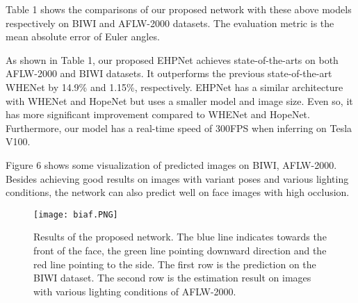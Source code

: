 \documentclass[a4paper,twoside]{article}
\begin{document}
Table 1 shows the comparisons of our proposed network with these above models respectively on BIWI and AFLW-2000 datasets. The evaluation metric is the mean absolute error of Euler angles. 

As shown in Table 1, our proposed EHPNet achieves state-of-the-arts on both AFLW-2000 and BIWI datasets. It outperforms the previous state-of-the-art WHENet by 14.9\% and 1.15\%, respectively. EHPNet has a similar architecture with WHENet and HopeNet but uses a smaller model and image size. Even so, it has more significant improvement compared to WHENet and HopeNet. Furthermore, our model has a real-time speed of 300FPS when inferring on Tesla V100.

Figure 6 shows some visualization of predicted images on BIWI, AFLW-2000. Besides achieving good results on images with variant poses and various lighting conditions, the network can also predict well on face images with high occlusion.

\begin{figure}[htp]
    \centering
    \texttt{[image: biaf.PNG]}
    \caption{Results of the proposed network. The blue line indicates towards the front of the face, the green line pointing downward direction and the red line pointing to the side. The first row is the prediction on the BIWI dataset. The second row is the estimation result on images with various lighting conditions of AFLW-2000. 
}
    \label{fig:galaxy}
\end{figure}
\end{document}
